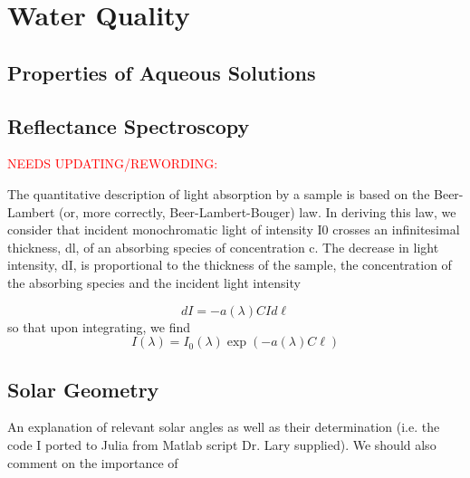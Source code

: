 







\section{Water Quality}

\subsection{Properties of Aqueous Solutions}
\subsection{Reflectance Spectroscopy}

\textcolor{red}{NEEDS UPDATING/REWORDING:}

The quantitative description of light absorption by a sample is based on the Beer-Lambert (or, more correctly, Beer-Lambert-Bouger) law. In deriving this law, we consider that incident monochromatic light of intensity I0 crosses an infinitesimal thickness, dl, of an absorbing species of concentration c. The decrease in light intensity, dI, is proportional to the thickness of the sample, the concentration of the absorbing species and the incident light intensity

\begin{equation}
dI = -a(\lambda)CI d\ell
\end{equation}
so that upon integrating, we find
\begin{equation}
  I(\lambda) = I_0(\lambda)\exp(-a(\lambda)C\ell)
\end{equation}


\subsection{Solar Geometry}

An explanation of relevant solar angles as well as their determination (i.e. the code I ported to Julia from Matlab script Dr. Lary supplied). We should also comment on the importance of


